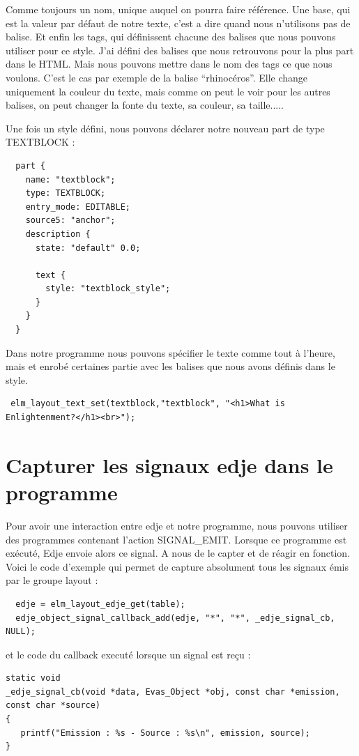 \documentclass[a4paper]{efr}
\begin{document}
Comme toujours un nom, unique auquel on pourra faire référence.
Une base, qui est la valeur par défaut de notre texte, c'est a dire
quand nous n'utilisons pas de balise. Et enfin les tags, qui définissent
chacune des balises que nous pouvons utiliser pour ce style.
J'ai défini des balises que nous retrouvons pour la plus part dans le HTML.
Mais nous pouvons mettre dans le nom des tags ce que nous voulons.
C'est le cas par exemple de la balise ``rhinocéros''. Elle change uniquement
la couleur du texte, mais comme on peut le voir pour les autres balises, on peut
changer la fonte du texte, sa couleur, sa taille.....

Une fois un style défini, nous pouvons déclarer notre nouveau part de type
TEXTBLOCK :

\begin{lstlisting}
  part {
    name: "textblock";
    type: TEXTBLOCK;
    entry_mode: EDITABLE;
    source5: "anchor";
    description {
      state: "default" 0.0;

      text {
        style: "textblock_style";
      }
    }
  }
\end{lstlisting}

Dans notre programme nous pouvons spécifier le texte comme tout à l'heure, mais
et enrobé certaines partie avec les balises que nous avons définis dans le style.

\begin{lstlisting}
 elm_layout_text_set(textblock,"textblock", "<h1>What is Enlightenment?</h1><br>");
\end{lstlisting}

\section{Capturer les signaux edje dans le programme}

Pour avoir une interaction entre edje et notre programme, nous pouvons utiliser
des programmes contenant l'action SIGNAL\_EMIT. Lorsque ce programme est
exécuté, Edje envoie alors ce signal. A nous de le capter et de réagir en
fonction.
Voici le code d'exemple qui permet de capture absolument tous les signaux émis
par le groupe layout :
\begin{lstlisting}
  edje = elm_layout_edje_get(table);
  edje_object_signal_callback_add(edje, "*", "*", _edje_signal_cb, NULL);
\end{lstlisting}

et le code du callback executé lorsque un signal est reçu :
\begin{lstlisting}
static void
_edje_signal_cb(void *data, Evas_Object *obj, const char *emission, const char *source)
{
   printf("Emission : %s - Source : %s\n", emission, source);
}
\end{lstlisting}
\end{document}
